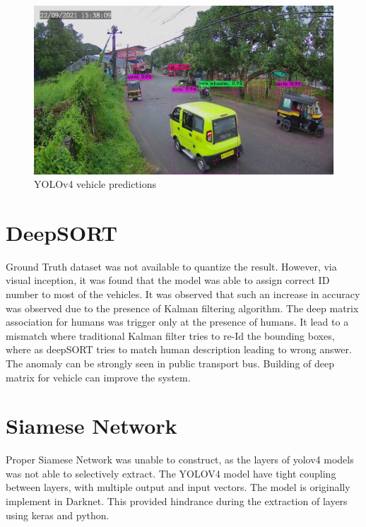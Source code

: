 \begin{figure}[ht!]
	\centering
	\includegraphics[width=0.8\linewidth]{Images/predictions}
	\caption{YOLOv4 vehicle predictions}
\end{figure}


\section{DeepSORT}
Ground Truth dataset was not available to quantize the result. However, via visual inception, it was found that the model was able to assign correct ID number to most of the vehicles. It was observed that such an increase in accuracy was observed due to the presence of Kalman filtering algorithm. The deep matrix association for humans was trigger only at the presence of humans. It lead to a mismatch where traditional Kalman filter tries to re-Id the bounding boxes, where as deepSORT tries to match human description leading to wrong answer. The anomaly can be strongly seen in public transport bus. Building of deep matrix for vehicle can improve the system.

\section{Siamese Network}
Proper Siamese Network was unable to construct, as the layers of yolov4 models was not able to selectively extract. The YOLOV4 model have tight coupling between layers, with multiple output and input vectors. The model is originally implement in Darknet.  This provided hindrance during the extraction of layers using keras and python.

